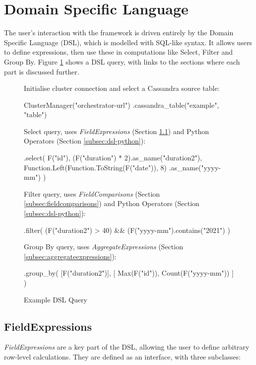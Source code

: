 \section{Domain Specific Language}
The user's interaction with the framework is driven entirely by the Domain Specific Language (DSL), which is modelled with SQL-like syntax. It allows users to define expressions, then use these in computations like Select, Filter and Group By. Figure \ref{fig:dsl-high-level-example} shows a DSL query, with links to the sections where each part is discussed further.

\begin{figure}[htp]
	Initialise cluster connection and select a Cassandra source table:
	\begin{python}
ClusterManager("orchestrator-url")
  .cassandra_table("example", "table")
	\end{python}
	
	Select query, uses \textit{FieldExpressions} (Section \ref{subsec:fieldexpressions}) and Python Operators (Section \ref{subsec:dsl-python}):
	\begin{python}
  .select(
    F("id"),
    (F("duration") * 2).as_name("duration2"),
    Function.Left(Function.ToString(F("date")), 8)
      .as_name("yyyy-mm")
  )
	\end{python}

	Filter query, uses \textit{FieldComparisons} (Section \ref{subsec:fieldcomparisons}) and Python Operators (Section \ref{subsec:dsl-python}):
	\begin{python}
  .filter(
    (F("duration2") > 40) && 
  	(F("yyyy-mm").contains("2021")
  )
	\end{python}

	Group By query, uses \textit{AggregateExpressions} (Section \ref{subsec:aggregateexpressions}):
	\begin{python}
  .group_by(
    [F("duration2")],
    [
      Max(F("id")),
      Count(F("yyyy-mm"))
    ]
  )
	\end{python}
	\caption{Example DSL Query}
	\label{fig:dsl-high-level-example}
\end{figure}


\subsection{FieldExpressions}\label{subsec:fieldexpressions}
\textit{FieldExpressions} are a key part of the DSL, allowing the user to define arbitrary row-level calculations. They are defined as an interface, with three subclasses:


